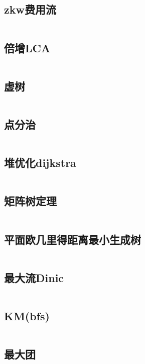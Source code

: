 \documentclass[UTF8]{ctexart}
\begin{document}
\subsection{zkw费用流}
\inputminted{cpp}{graphtheory/zkw费用流.cpp}

\subsection{倍增LCA}
\inputminted{cpp}{graphtheory/倍增LCA.cpp}

\subsection{虚树}
\inputminted{cpp}{graphtheory/VirtualTree.cpp}

\subsection{点分治}
\inputminted{cpp}{graphtheory/点分治.cpp}

\subsection{堆优化dijkstra}
\inputminted{cpp}{graphtheory/堆优化dijkstra.cpp}

\subsection{矩阵树定理}
\inputminted{cpp}{graphtheory/矩阵树定理.cpp}

\subsection{平面欧几里得距离最小生成树}
\inputminted{cpp}{graphtheory/平面欧几里得距离最小生成树.cpp}

\subsection{最大流Dinic}
\inputminted{cpp}{graphtheory/最大流Dinic.cpp}

\subsection{KM(bfs)}
\inputminted{cpp}{graphtheory/KM_bfs.cpp}

\subsection{最大团}
\inputminted{cpp}{graphtheory/最大团.cpp}
\end{document}
